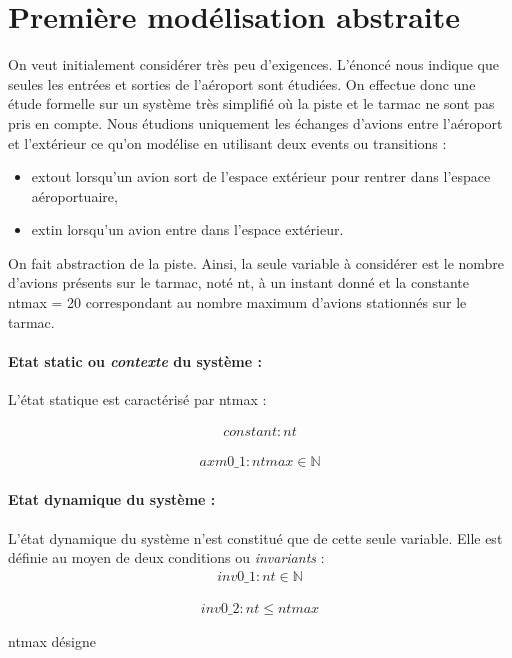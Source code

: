 \section{Première modélisation abstraite}
	

   On veut initialement considérer très peu d'exigences. L'énoncé nous indique
   que seules les entrées et sorties de l'aéroport sont étudiées. On effectue donc une étude formelle sur un système très simplifié où la piste et le tarmac ne sont pas pris en compte. Nous étudions uniquement les échanges d'avions entre l'aéroport et l'extérieur ce qu'on modélise en utilisant deux events ou transitions :
   
   \begin{itemize}
   	\item extout lorsqu'un avion sort de l'espace extérieur pour rentrer dans l'espace aéroportuaire,
   	\item extin lorsqu'un avion entre dans l'espace extérieur.
   \end{itemize} 

On fait abstraction de la piste. Ainsi, la seule variable à considérer est le nombre d'avions présents sur le tarmac, noté nt, à un instant donné et la constante ntmax = 20 correspondant au nombre maximum d'avions stationnés sur le tarmac.

\paragraph{Etat static ou \textit{contexte} du système :}
L'état statique est caractérisé par ntmax :

  \begin{align}
constant: nt 
\end{align}


 \begin{align}
axm0\_1: ntmax \in ℕ 
\end{align}

\paragraph{Etat dynamique du système :}
 L'état dynamique du système n'est constitué que de cette seule variable. Elle est définie au moyen de deux conditions ou \textit{invariants} :
   \begin{align}
  inv0\_1 : nt \in ℕ 
   \end{align}
   
    \begin{align}
   inv0\_2 : nt \le ntmax
   \end{align}
   
  ntmax désigne
